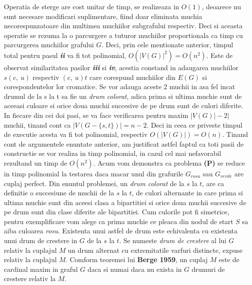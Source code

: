 \documentclass{article}
\begin{document}
\newline
\newline
Operatia de sterge are cost unitar de timp, se realizeaza in $O(1)$, deoarece nu sunt necesare modificari suplimentare, fiind doar eliminata muchia necorespunzatoare din multimea muchiilor subgrafului respectiv. Deci si aceasta operatie se rezuma la o parcurgere a tuturor muchiilor proportionala ca timp cu parcurgerea muchiilor grafului $G$. Deci, prin cele mentionate anterior, timpul total pentru pasul \textbf{\textit{ii}} va fi tot polinomial, $O(|V(G)|^2)=O(n^2)$.
\newline
\newline
Este de observat similaritatea pasilor \textbf{\textit{iii}} si \textbf{\textit{iv}}, acestia constand in adaugarea muchiilor $s(c,\ u)$ respectiv $(c,\ u)t$ care corespund muchiilor din $E(G)$ si corespondentelor lor cromatice. Se vor adauga aceste 2 muchii in asa fel incat drumul de la s la t sa fie un \textit{drum colorat}, adica prima si ultima muchie sunt de aceeasi culoare si orice doua muchii succesive de pe drum sunt de culori diferite. In fiecare din cei doi pasi, se va face verificarea pentru maxim $|V(G)|-2|$ muchii, tinand cont ca $|V(G-\{s,t\})|=n-2$. Deci  in ceea ce priveste timpul de executie acesta va fi tot polinomial, respectiv $O(|V(G)|)=O(n)$.
\newline
\newline
Tinand cont de argumentele enuntate anterior, am justificat astfel faptul ca toti pasii de constructie se vor realiza in timp polinomial, in cazul cel mai nefavorabil rezultand un timp de $O(n^2)$.
\newline
\newline
Acum vom demonstra ca problema \textbf{(P)} se reduce in timp polinomial la testarea daca macar unul din grafurile $G_{rosu}$ sau $G_{verde}$ are cuplaj perfect.
\newline
\newline
Din enuntul problemei, un  \textit{drum colorat} de la $s$ la $t$, are ca definitie o succesiune de muchii de la $s$ la $t$, de culori alternante in care prima si ultima muchie sunt din aceesi clasa a bipartitiei si orice doua muchii succesive de pe drum sunt din clase diferite ale bipartitiei. Cum culorile pot fi simetrice, pentru exemplificare vom alege ca prima muchie ce pleaca din nodul de start $S$ sa aiba culoarea \textit{rosu}.
\newline
\newline
Existenta unui astfel de drum  este echivalenta cu existenta unui drum de crestere in $G$ de la $s$ la $t$. Se numeste \textit{drum de crestere} al lui $G$ relativ la cuplajul $M$ un drum alternat cu extremitatile varfuri distincte, expuse relativ la cuplajul $M$. Comform teoremei lui \textbf{Berge 1959}, un cuplaj $M$ este de cardinal maxim in graful $G$ daca si numai daca nu exista in $G$ drumuri de crestere relativ la $M$.
\end{document}
